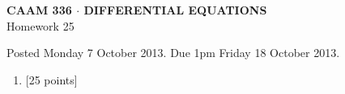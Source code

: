 \documentclass[10pt]{article}
\begin{document}
\vspace*{-5em}
\begin{center}
\large \textsf{\textbf{CAAM 336 $\cdot$ DIFFERENTIAL EQUATIONS}\\[0.5em]
Homework 25 }
\end{center}

Posted Monday 7 October 2013.  Due 1pm Friday 18 October 2013.

\begin{enumerate}\addtocounter{enumi}{24}
\item {[25 points]}  
\end{enumerate}
\end{document}
